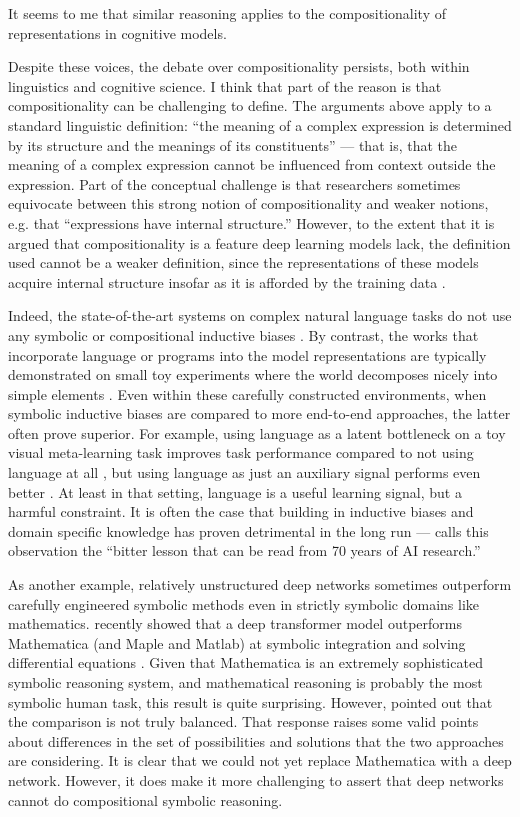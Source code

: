 It seems to me that similar reasoning applies to the compositionality of representations in cognitive models. \par
Despite these voices, the debate over compositionality persists, both within linguistics and cognitive science. I think that part of the reason is that compositionality can be challenging to define. The arguments above apply to a standard linguistic definition: ``the meaning of a complex expression is determined by its structure and the meanings of its constituents'' \citep{sep-compositionality} --- that is, that the meaning of a complex expression cannot be influenced from context outside the expression. Part of the conceptual challenge is that researchers sometimes equivocate between this strong notion of compositionality and weaker notions, e.g. that ``expressions have internal structure.'' However, to the extent that it is argued that compositionality is a feature deep learning models lack, the definition used cannot be a weaker definition, since the representations of these models acquire internal structure insofar as it is afforded by the training data \citep[e.g.][]{Mikolov2013}. \par
Indeed, the state-of-the-art systems on complex natural language tasks do not use any symbolic or compositional inductive biases \citep[e.g.][]{Radford2019,Raffel2019}. By contrast, the works that incorporate language or programs into the model representations are typically demonstrated on small toy experiments where the world decomposes nicely into simple elements \citep{Andreas2017,Mao2019}. Even within these carefully constructed environments, when symbolic inductive biases are compared to more end-to-end approaches, the latter often prove superior. For example, using language as a latent bottleneck on a toy visual meta-learning task improves task performance compared to not using language at all \citep{Andreas2017}, but using language as just an auxiliary signal performs even better \citep{Mu2019}. At least in that setting, language is a useful learning signal, but a harmful constraint. It is often the case that building in inductive biases and domain specific knowledge has proven detrimental in the long run --- \citet{Sutton2019} calls this observation the ``bitter lesson that can be read from 70 years of AI research.'' \par
As another example, relatively unstructured deep networks sometimes outperform carefully engineered symbolic methods even in strictly symbolic domains like mathematics. \citet{Lample2019} recently showed that a deep transformer model outperforms Mathematica (and Maple and Matlab) at symbolic integration and solving differential equations \citep{Lample2019}. Given that Mathematica is an extremely sophisticated symbolic reasoning system, and mathematical reasoning is probably the most symbolic human task, this result is quite surprising. However, \citet{Davis2019} pointed out that the comparison is not truly balanced. That response raises some valid points about differences in the set of possibilities and solutions that the two approaches are considering. It is clear that we could not yet replace Mathematica with a deep network. However, it does make it more challenging to assert that deep networks cannot do compositional symbolic reasoning. \par
